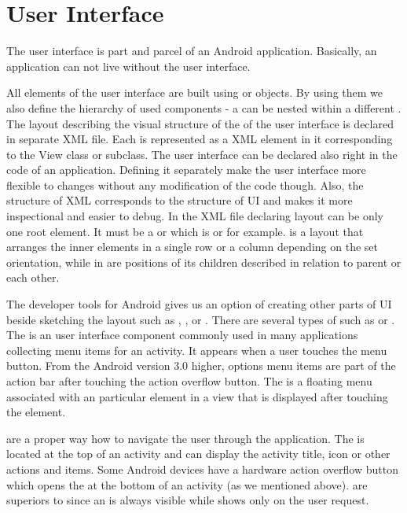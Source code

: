 


\section{User Interface}
\label{sec:ui}

The user interface is part and parcel of an Android application.
Basically, an application can not live without the user interface.

All elements of the user interface are built using  or  objects.
By using them we also define the hierarchy of used components - a  can be nested within a different .
The layout describing the visual structure of the  of the user interface is declared in separate XML file.
Each  is represented as a XML element in it corresponding to the View class or subclass.
The user interface can be declared also right in the code of an application. 
Defining it separately make the user interface more flexible to changes without any modification of the code though.
Also, the structure of XML corresponds to the structure of UI and makes it more inspectional and easier to debug.
In the XML file declaring layout can be only one root element. 
It must be a  or  which is  or  for example.
 is a layout that arranges the inner elements in a single row or a column depending on the set orientation, 
while in  are positions of its children described in relation to parent or each other.

The developer tools for Android gives us an option of creating other parts of UI beside sketching the layout such as , ,  or .
There are several types of  such as  or .
The  is an user interface component commonly used in many applications collecting menu items for an activity.
It appears when a user touches the menu button.
From the Android version 3\@.0 higher, options menu items are part of the action bar after touching the action overflow button.
The  is a floating menu associated with an particular element in a view that is displayed after touching the element.

 are a proper way how to navigate the user through the application.
The  is located at the top of an activity and can display the activity title, icon or other actions and items.
Some Android devices have a hardware action overflow button which opens the  at the bottom of an activity (as we mentioned above).
 are superiors to  since an  is always visible while  shows only on the user request.

